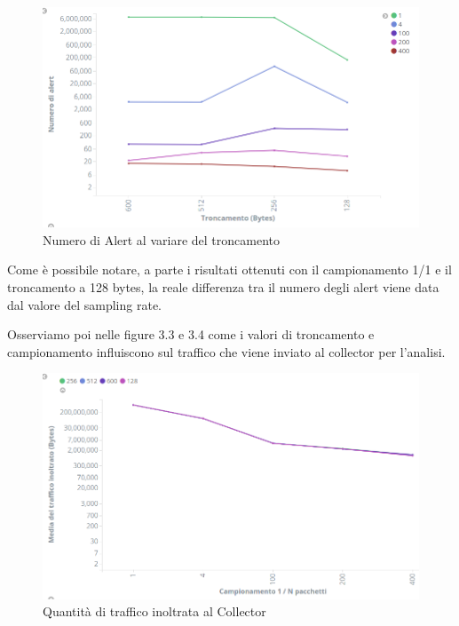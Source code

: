 \documentclass[12pt,a4paper,openright,twoside]{report}
\begin{document}
\begin{figure}[h!]
\begin{center}                          %
  \includegraphics[width=\textwidth]{images/ICTF--tunc-vs-samp.png}
  \caption{Numero di Alert al variare del troncamento}
  \label{}
\end{center}
\end{figure}

Come \`e possibile notare, a parte i risultati ottenuti con il campionamento 1/1 e il
troncamento a 128 bytes, la reale differenza tra il numero degli alert viene data dal
valore del sampling rate.

Osserviamo poi nelle figure 3.3 e 3.4 come i valori di troncamento e campionamento influiscono sul traffico
che viene inviato al collector per l'analisi.

\begin{figure}[h!]
\begin{center}                          %
  \includegraphics[width=\textwidth]{images/ICTF-samp-vs-traffic.png}
  \caption{Quantit\`a di traffico inoltrata al Collector}
  \label{}
\end{center}
\end{figure}
\end{document}
